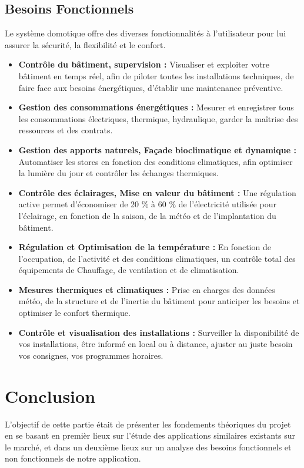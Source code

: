 \begin{spacing}{1.2}
\subsection{Besoins Fonctionnels}
Le système domotique offre des diverses fonctionnalités à l’utilisateur pour lui assurer la sécurité, la flexibilité et le confort. \\

\begin{itemize}

\item \textbf{Contrôle du bâtiment, supervision :} 
Visualiser et exploiter votre bâtiment en temps réel, afin de piloter toutes les installations techniques, de faire face aux besoins énergétiques, d’établir une maintenance préventive.

\item \textbf{Gestion des consommations énergétiques :}
Mesurer et enregistrer tous les consommations électriques, thermique, hydraulique, garder la maîtrise des ressources et des contrats.

\item \textbf{Gestion des apports naturels, Façade bioclimatique et dynamique :}
Automatiser les stores en fonction des conditions climatiques, afin optimiser la lumière du jour et contrôler les échanges thermiques. 

\item \textbf{Contrôle des éclairages, Mise en valeur du bâtiment :}
Une régulation active permet d’économiser de 20 \% à 60 \% de l’électricité utilisée pour l’éclairage, en fonction de la saison, de la météo et de l’implantation du bâtiment.

\item \textbf{Régulation et Optimisation de la température :}
En fonction de l’occupation, de l’activité et des conditions climatiques, un contrôle total des équipements de Chauffage, de ventilation et de climatisation.

\item \textbf{Mesures thermiques et climatiques :}
Prise en charges des données météo, de la structure et de l’inertie du bâtiment pour anticiper les besoins et optimiser le confort thermique. 


\item \textbf{Contrôle et visualisation des installations :}
Surveiller la disponibilité de vos installations, être informé en local ou à distance, ajuster au juste besoin vos consignes, vos programmes horaires.
\end{itemize}




\section*{Conclusion}
L'objectif de cette partie était de présenter les fondements théoriques du projet en se basant en premièr lieux sur l'étude des applications similaires existants sur le marché, et dans un deuxième lieux sur un analyse des besoins fonctionnels et non fonctionnels de notre application.


\end{spacing}
